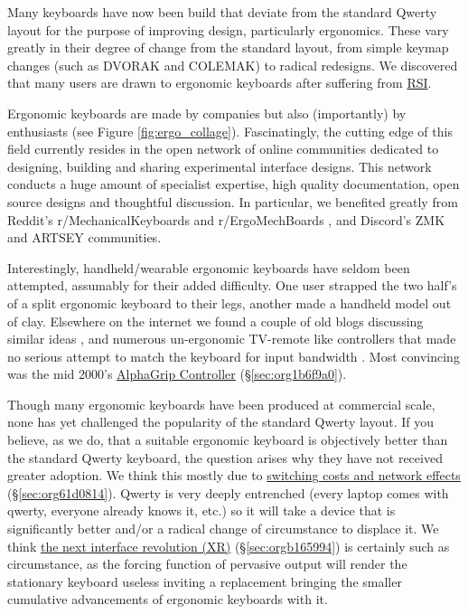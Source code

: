 \documentclass[logo,bsc,singlespacing,parskip]{infthesis}
\begin{document}
Many keyboards have now been build that deviate from the standard Qwerty layout for the purpose of improving design, particularly ergonomics.
These vary greatly in their degree of change from the standard layout, from simple keymap changes (such as DVORAK and COLEMAK) to radical redesigns.
We discovered that many users are drawn to ergonomic keyboards after suffering from \hyperref[org77f0234]{RSI}.

Ergonomic keyboards are made by companies but also (importantly) by enthusiasts (see Figure \ref{fig:ergo_collage}).
Fascinatingly, the cutting edge of this field currently resides in the open network of online communities dedicated to designing, building and sharing  experimental interface designs.
This network conducts a huge amount of specialist expertise, high quality documentation, open source designs and thoughtful discussion.
In particular, we benefited greatly from Reddit's r/MechanicalKeyboards \autocite{MechanicalKeyboardsAllClick} and  r/ErgoMechBoards \autocite{ErgoMechBoards} , and Discord's ZMK and ARTSEY communities.

Interestingly, handheld/wearable ergonomic keyboards have seldom been attempted, assumably for their added difficulty.
One user strapped the two half's of a split ergonomic keyboard to their legs, another made a handheld model out of clay.
Elsewhere on the internet we found a couple of old blogs discussing similar ideas \autocite{ChorditeAnotherOnehand}, and numerous un-ergonomic TV-remote like controllers that made no serious attempt to match the keyboard for input bandwidth \autocite{TwiddlerTekGear} .
Most convincing was the mid 2000's \hyperref[sec:org1b6f9a0]{AlphaGrip Controller} (\S \ref{sec:org1b6f9a0}).

Though many ergonomic keyboards have been produced at commercial scale, none has yet challenged the popularity of the standard Qwerty layout.
If you believe, as we do, that a suitable ergonomic keyboard is objectively better than the standard Qwerty keyboard, the question arises why they have not received greater adoption.
We think this mostly due to \hyperref[sec:org61d0814]{switching costs and network effects} (\S \ref{sec:org61d0814}).
Qwerty is very deeply entrenched (every laptop comes with qwerty, everyone already knows it, etc.) so it will take a device that is significantly better and/or a radical change of circumstance to displace it.
We think \hyperref[sec:orgb165994]{the next interface revolution (XR)} (\S \ref{sec:orgb165994}) is certainly such as circumstance, as the forcing function of pervasive output will render the stationary keyboard useless inviting a replacement bringing the smaller cumulative advancements of ergonomic keyboards with it.
\end{document}
